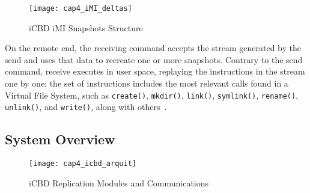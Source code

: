 \begin{figure}[htbp]
    \centering
    \texttt{[image: cap4\_iMI\_deltas]}
    \caption{iCBD iMI Snapshots Structure}
    \label{fig:icbd_rep_imi_snap}
\end{figure}

On the remote end, the receiving command accepts the stream generated by the send and uses that data to recreate one or more snapshots. Contrary to the send command, receive executes in user space, replaying the instructions in the stream one by one; the set of instructions includes the most relevant calls found in a Virtual File System, such as \texttt{create()}, \texttt{mkdir()}, \texttt{link()}, \texttt{symlink()}, \texttt{rename()}, \texttt{unlink()}, and \texttt{write()}, along with others~\cite{btrfs_design}.





\subsection{System Overview}
\label{sub:impl_system_overview}


\begin{figure}[htbp]
	\centering
	\texttt{[image: cap4\_icbd\_arquit]}
	\caption{iCBD Replication Modules and Communications}
	\label{fig:icbd_rep_mods_comms}
\end{figure}
 



